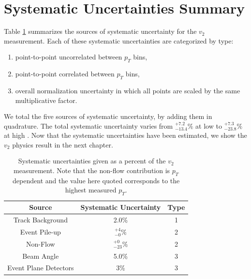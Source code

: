 \section{Systematic Uncertainties Summary}
Table \ref{tbl:sys_uncert} summarizes the sources of systematic uncertainty for the $v_2$ measurement. Each of these systematic uncertainties are categorized by type:
\begin{enumerate}
\item point-to-point uncorrelated between $p_T$ bins,
\item point-to-point correlated between $p_T$ bins,
\item overall normalization uncertainty in which all points are scaled by the same multiplicative factor.
\end{enumerate}
We total the five sources of systematic uncertainty, by adding them in quadrature. The total systematic uncertainty varies from $^{+7.2}_{-13.4}\%$ at low \pt to $^{+7.3}_{-23.8}\%$ at high \pt. Now that the systematic uncertainties have been estimated, we show the $v_2$ physics result in the next chapter.

\begin{table}[!h]
  \begin{center}
  \caption{\label{t:sys}Systematic uncertainties given as a percent of the $v_2$ measurement. Note that the non-flow contribution is $p_T$ dependent and the value here quoted corresponds to the highest measured $p_T$.}
    \begin{tabular}{ccc}
      \hline
      \hline
      Source& Systematic Uncertainty & Type \\ \hline
      Track Background &2.0\%& 1\\ 
      Event Pile-up    &$^{+4}_{-0}\%$& 2\\
      Non-Flow    &$^{+0}_{-23}\%$& 2\\
      Beam Angle &5.0\%& 3\\  
      Event Plane Detectors & 3\% & 3\\
    \hline
    \hline
    \end{tabular}
   \end{center}
   \label{tbl:sys_uncert}
 \end{table}



